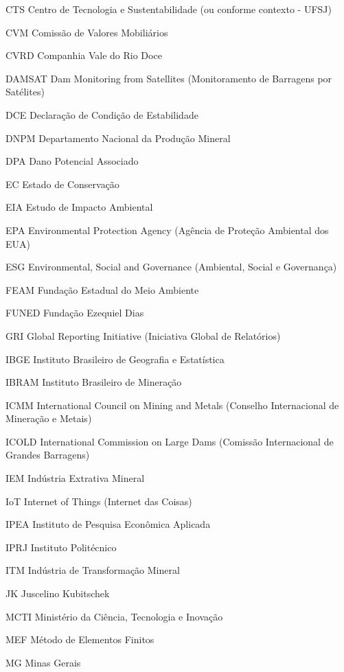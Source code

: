 \begin{siglas}
    \item[CTS] Centro de Tecnologia e Sustentabilidade (ou conforme contexto - UFSJ)
    \item[CVM] Comissão de Valores Mobiliários
    \item[CVRD] Companhia Vale do Rio Doce
    \item[DAMSAT] Dam Monitoring from Satellites (Monitoramento de Barragens por Satélites)
    \item[DCE] Declaração de Condição de Estabilidade
    \item[DNPM] Departamento Nacional da Produção Mineral
    \item[DPA] Dano Potencial Associado
    \item[EC] Estado de Conservação
    \item[EIA] Estudo de Impacto Ambiental
    \item[EPA] Environmental Protection Agency (Agência de Proteção Ambiental dos EUA)
    \item[ESG] Environmental, Social and Governance (Ambiental, Social e Governança)
    \item[FEAM] Fundação Estadual do Meio Ambiente
    \item[FUNED] Fundação Ezequiel Dias
    \item[GRI] Global Reporting Initiative (Iniciativa Global de Relatórios)
    \item[IBGE] Instituto Brasileiro de Geografia e Estatística
    \item[IBRAM] Instituto Brasileiro de Mineração
    \item[ICMM] International Council on Mining and Metals (Conselho Internacional de Mineração e Metais)
    \item[ICOLD] International Commission on Large Dams (Comissão Internacional de Grandes Barragens)
    \item[IEM] Indústria Extrativa Mineral
    \item[IoT] Internet of Things (Internet das Coisas)
    \item[IPEA] Instituto de Pesquisa Econômica Aplicada
    \item[IPRJ] Instituto Politécnico
    \item[ITM] Indústria de Transformação Mineral
    \item[JK] Juscelino Kubitschek
    \item[MCTI] Ministério da Ciência, Tecnologia e Inovação
    \item[MEF] Método de Elementos Finitos
    \item[MG] Minas Gerais

\end{siglas}
